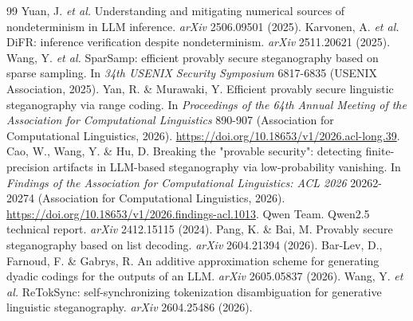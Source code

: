 \documentclass[11pt,a4paper]{article}
\begin{document}
\begin{thebibliography}{99}
 Yuan, J. \textit{et al.} Understanding and mitigating numerical sources of nondeterminism in LLM inference. \textit{arXiv} 2506.09501 (2025).
 Karvonen, A. \textit{et al.} DiFR: inference verification despite nondeterminism. \textit{arXiv} 2511.20621 (2025).
 Wang, Y. \textit{et al.} SparSamp: efficient provably secure steganography based on sparse sampling. In \textit{34th USENIX Security Symposium} 6817-6835 (USENIX Association, 2025).
 Yan, R. \& Murawaki, Y. Efficient provably secure linguistic steganography via range coding. In \textit{Proceedings of the 64th Annual Meeting of the Association for Computational Linguistics} 890-907 (Association for Computational Linguistics, 2026). \url{https://doi.org/10.18653/v1/2026.acl-long.39}.
 Cao, W., Wang, Y. \& Hu, D. Breaking the "provable security": detecting finite-precision artifacts in LLM-based steganography via low-probability vanishing. In \textit{Findings of the Association for Computational Linguistics: ACL 2026} 20262-20274 (Association for Computational Linguistics, 2026). \url{https://doi.org/10.18653/v1/2026.findings-acl.1013}.
 Qwen Team. Qwen2.5 technical report. \textit{arXiv} 2412.15115 (2024).
 Pang, K. \& Bai, M. Provably secure steganography based on list decoding. \textit{arXiv} 2604.21394 (2026).
 Bar-Lev, D., Farnoud, F. \& Gabrys, R. An additive approximation scheme for generating dyadic codings for the outputs of an LLM. \textit{arXiv} 2605.05837 (2026).
 Wang, Y. \textit{et al.} ReTokSync: self-synchronizing tokenization disambiguation for generative linguistic steganography. \textit{arXiv} 2604.25486 (2026).
\end{thebibliography}
\end{document}
